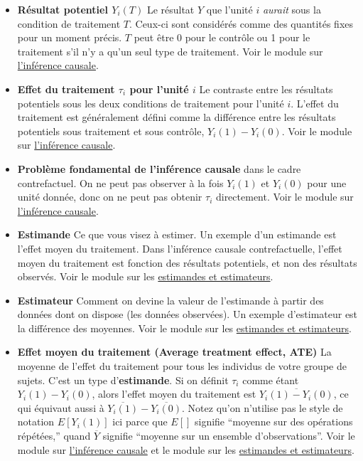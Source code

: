 \documentclass[
  12pt,
]{book}
\begin{document}
\begin{itemize}
\item
  \textbf{Résultat potentiel \(Y_i(T)\)} Le résultat \(Y\) que l'unité \(i\) \emph{aurait} sous la condition de traitement \(T\). Ceux-ci sont considérés comme des quantités fixes pour un moment précis.
  \(T\) peut être 0 pour le contrôle ou 1 pour le traitement s'il n'y a qu'un seul type de traitement. Voir le module sur \href{causal-inference.html}{l'inférence causale}.
\item
  \textbf{Effet du traitement \(\tau_i\) pour l'unité \(i\)} Le contraste entre les résultats potentiels sous les deux conditions de traitement pour l'unité \(i\).
  L'effet du traitement est généralement défini comme la différence entre les résultats potentiels sous traitement et sous contrôle, \(Y_i(1)-Y_i(0)\).
  Voir le module sur \href{causal-inference.html}{l'inférence causale}.
\item
  \textbf{Problème fondamental de l'inférence causale} dans le cadre contrefactuel. On ne peut pas observer à la fois \(Y_i(1)\) et \(Y_i(0)\) pour une unité donnée, donc on ne peut pas obtenir \(\tau_i\) directement.
  Voir le module sur \href{causal-inference.html}{l'inférence causale}.
\item
  \textbf{Estimande} Ce que vous visez à estimer. Un exemple d'un estimande est l'effet moyen du traitement.
  Dans l'inférence causale contrefactuelle, l'effet moyen du traitement est fonction des résultats potentiels, et non des résultats observés.
  Voir le module sur les \href{estimands-and-estimators.html}{estimandes et estimateurs}.
\item
  \textbf{Estimateur} Comment on devine la valeur de l'estimande à partir des données dont on dispose (les données observées).
  Un exemple d'estimateur est la différence des moyennes. Voir le module sur les \href{estimands-and-estimators.html}{estimandes et estimateurs}.
\item
  \textbf{Effet moyen du traitement (Average treatment effect, ATE)} La moyenne de l'effet du traitement pour tous les individus de votre groupe de sujets.
  C'est un type d'\textbf{estimande}. Si on définit \(\tau_i\) comme étant \(Y_i(1)-Y_i(0)\), alors l'effet moyen du traitement est \(\overline{Y_i(1)-Y_i(0)}\), ce qui équivaut aussi à \(\overline{{Y}_i(1)}-\overline{{Y}_i(0)}\).
  Notez qu'on n'utilise pas le style de notation \(E[Y_i (1)]\) ici parce que \(E[]\) signifie ``moyenne sur des opérations répétées,'' quand \(\overline{Y}\) signifie ``moyenne sur un ensemble d'observations''.
  Voir le module sur \href{causal-inference.html}{l'inférence causale} et le module sur les \href{estimands-and-estimators.html}{estimandes et estimateurs}.

\end{itemize}
\end{document}
